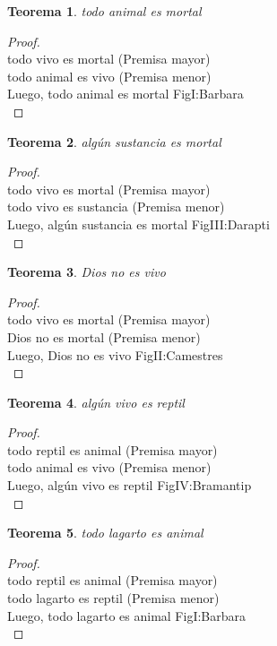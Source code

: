 ﻿\documentclass[12pt]{book}
\newtheorem{theorem}{Teorema}[chapter]
\newtheorem{proof}{Demostración}
\begin{document}
\begin{theorem}
todo animal es mortal
\label{th: 26}
\end{theorem}\begin{proof}\\todo vivo es mortal	 (Premisa mayor) \\todo animal es vivo	 (Premisa menor) \\Luego, todo animal es mortal	FigI:Barbara \\ \end{proof}
\begin{theorem}
algún sustancia es mortal
\label{th: 27}
\end{theorem}\begin{proof}\\todo vivo es mortal	 (Premisa mayor) \\todo vivo es sustancia	 (Premisa menor) \\Luego, algún sustancia es mortal	FigIII:Darapti \\ \end{proof}
\begin{theorem}
Dios no es vivo
\label{th: 28}
\end{theorem}\begin{proof}\\todo vivo es mortal	 (Premisa mayor) \\Dios no es mortal	 (Premisa menor) \\Luego, Dios no es vivo	FigII:Camestres \\ \end{proof}
\begin{theorem}
algún vivo es reptil
\label{th: 29}
\end{theorem}\begin{proof}\\todo reptil es animal	 (Premisa mayor) \\todo animal es vivo	 (Premisa menor) \\Luego, algún vivo es reptil	FigIV:Bramantip \\ \end{proof}
\begin{theorem}
todo lagarto es animal
\label{th: 30}
\end{theorem}\begin{proof}\\todo reptil es animal	 (Premisa mayor) \\todo lagarto es reptil	 (Premisa menor) \\Luego, todo lagarto es animal	FigI:Barbara \\ \end{proof}
\end{document}
